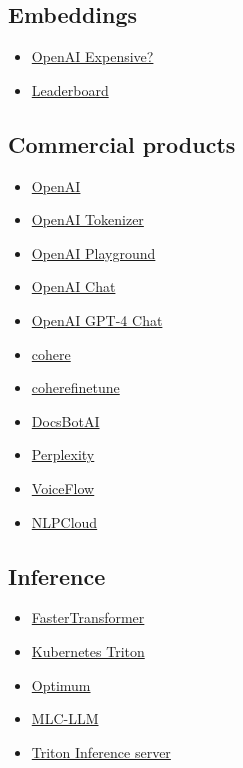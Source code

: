 \documentclass{article}
\begin{document}
\subsection*{Embeddings}
\begin{itemize}
    \item \href{https://medium.com/@nils_reimers/openai-gpt-3-text-embeddings-really-a-new-state-of-the-art-in-dense-text-embeddings-6571fe3ec9d9}{OpenAI Expensive?}
    \item \href{https://huggingface.co/spaces/mteb/leaderboard}{Leaderboard}
\end{itemize}

\subsection*{Commercial products}
\begin{itemize}
    \item \href{https://platform.openai.com/docs/guides/fine-tuning/advanced-usage}{OpenAI}
    \item \href{https://platform.openai.com/tokenizer}{OpenAI Tokenizer}
    \item \href{https://platform.openai.com/playground}{OpenAI Playground}
    \item \href{https://chat.openai.com/chat?}{OpenAI Chat}
    \item \href{https://chat.openai.com/chat?model=gpt-4}{OpenAI GPT-4 Chat}
    \item \href{https://cohere.io/}{cohere}
    \item \href{https://docs.cohere.ai/reference/finetune}{coherefinetune}
    \item \href{https://docsbot.ai/}{DocsBotAI}
    \item \href{https://www.perplexity.ai/}{Perplexity}
    \item \href{https://www.voiceflow.com/}{VoiceFlow}
    \item \href{https://nlpcloud.com/effectively-using-gpt-j-gpt-neo-gpt-3-alternatives-few-shot-learning.html}{NLPCloud}
\end{itemize}

\subsection*{Inference}
\begin{itemize}
    \item \href{https://github.com/triton-inference-server/fastertransformer_backend#multi-node-inference}{FasterTransformer}
    \item \href{https://developer.nvidia.com/blog/deploying-nvidia-triton-at-scale-with-mig-and-kubernetes/}{Kubernetes Triton}
    \item \href{https://github.com/huggingface/optimum}{Optimum}
    \item \href{https://github.com/mlc-ai/mlc-llm}{MLC-LLM}
    \item \href{https://github.com/triton-inference-server}{Triton Inference server}
\end{itemize}
\end{document}
